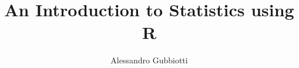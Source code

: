 

\newcommand{\sidenote}[1]{%
        \refstepcounter{sidenote}\mbox{\textsuperscript{\alph{sidenote}}}%
        \marginpar{\footnotesize \mbox{\textsuperscript{\alph{sidenote}} }#1}%
}

\newcommand{\subscript}[2]{$#1 _ #2$}




\newcommand{\mc}[1]{{\mathcal #1}}
\newcommand{\mf}[1]{{\mathfrak #1}}
\newcommand{\mb}[1]{{\mathbf #1}}
\newcommand{\bb}[1]{{\mathbb #1}}

\newcommand{\bs}[1]{{\boldsymbol #1}}
\newcommand{\ms}[1]{{\mathscr #1}}


\newcommand{\mt}[1]{{\texttt #1}}

\newcommand{\<}{{\langle \!\! \langle}}
\renewcommand{\>}{{\rangle \!\! \rangle}}

\newcommand{\bel}[2]{\begin{equation} \label{#1} \begin{split} #2
 					\end{split} \end{equation}}


\newcommand{\mmu}{{\pmb \mu}}
\newcommand{\jj}{{\pmb j}}

\usepackage{color}
\newcommand{\commento}[1]{
	\par\noindent
	\colorbox{light}{\begin{minipage}{120 mm}#1\end{minipage}}
	\par\noindent
}


\parindent0pt






\title{ An Introduction to Statistics using R}
\author{Alessandro Gubbiotti}


